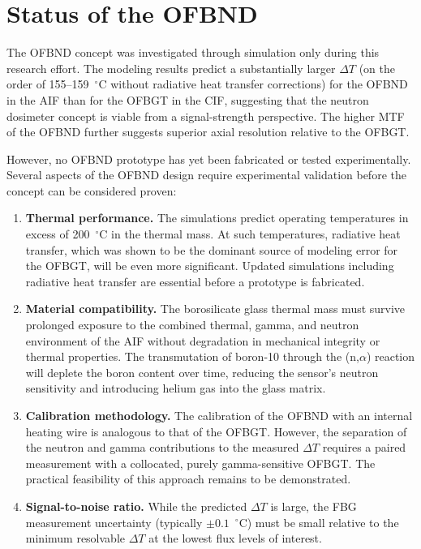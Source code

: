 \section{Status of the OFBND}
\label{sec:ofbnd_status}

The OFBND concept was investigated through simulation only during this research effort.  The modeling results predict a substantially larger $\Delta T$ (on the order of 155--159~$^\circ$C without radiative heat transfer corrections) for the OFBND in the AIF than for the OFBGT in the CIF, suggesting that the neutron dosimeter concept is viable from a signal-strength perspective.  The higher MTF of the OFBND further suggests superior axial resolution relative to the OFBGT.

However, no OFBND prototype has yet been fabricated or tested experimentally.  Several aspects of the OFBND design require experimental validation before the concept can be considered proven:

\begin{enumerate}
    \item \textbf{Thermal performance.}  The simulations predict operating temperatures in excess of 200~$^\circ$C in the thermal mass.  At such temperatures, radiative heat transfer, which was shown to be the dominant source of modeling error for the OFBGT, will be even more significant.  Updated simulations including radiative heat transfer are essential before a prototype is fabricated.
    \item \textbf{Material compatibility.}  The borosilicate glass thermal mass must survive prolonged exposure to the combined thermal, gamma, and neutron environment of the AIF without degradation in mechanical integrity or thermal properties.  The transmutation of boron-10 through the (n,$\alpha$) reaction will deplete the boron content over time, reducing the sensor's neutron sensitivity and introducing helium gas into the glass matrix.
    \item \textbf{Calibration methodology.}  The calibration of the OFBND with an internal heating wire is analogous to that of the OFBGT.  However, the separation of the neutron and gamma contributions to the measured $\Delta T$ requires a paired measurement with a collocated, purely gamma-sensitive OFBGT.  The practical feasibility of this approach remains to be demonstrated.
    \item \textbf{Signal-to-noise ratio.}  While the predicted $\Delta T$ is large, the FBG measurement uncertainty (typically $\pm 0.1$~$^\circ$C) must be small relative to the minimum resolvable $\Delta T$ at the lowest flux levels of interest.
\end{enumerate}


